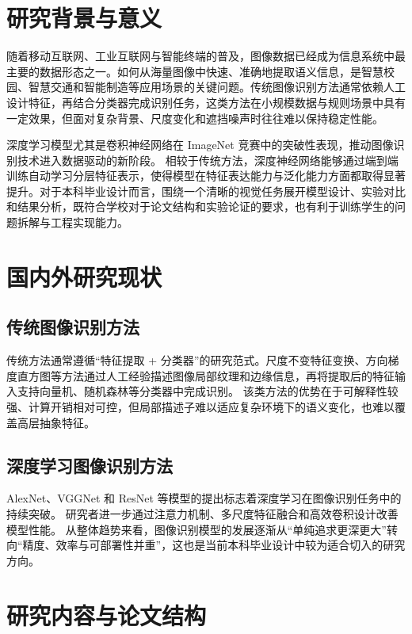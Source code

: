 \section{研究背景与意义}

随着移动互联网、工业互联网与智能终端的普及，图像数据已经成为信息系统中最主要的数据形态之一。如何从海量图像中快速、准确地提取语义信息，是智慧校园、智慧交通和智能制造等应用场景的关键问题。传统图像识别方法通常依赖人工设计特征，再结合分类器完成识别任务，这类方法在小规模数据与规则场景中具有一定效果，但面对复杂背景、尺度变化和遮挡噪声时往往难以保持稳定性能。

深度学习模型尤其是卷积神经网络在 ImageNet 竞赛中的突破性表现，推动图像识别技术进入数据驱动的新阶段。\supercite{krizhevsky2012imagenet,he2016deep} 相较于传统方法，深度神经网络能够通过端到端训练自动学习分层特征表示，使得模型在特征表达能力与泛化能力方面都取得显著提升。对于本科毕业设计而言，围绕一个清晰的视觉任务展开模型设计、实验对比和结果分析，既符合学校对于论文结构和实验论证的要求，也有利于训练学生的问题拆解与工程实现能力。

\section{国内外研究现状}

\subsection{传统图像识别方法}

传统方法通常遵循“特征提取 + 分类器”的研究范式。尺度不变特征变换、方向梯度直方图等方法通过人工经验描述图像局部纹理和边缘信息，再将提取后的特征输入支持向量机、随机森林等分类器中完成识别。\supercite{lowe2004sift,dalal2005hog} 该类方法的优势在于可解释性较强、计算开销相对可控，但局部描述子难以适应复杂环境下的语义变化，也难以覆盖高层抽象特征。

\subsection{深度学习图像识别方法}

AlexNet、VGGNet 和 ResNet 等模型的提出标志着深度学习在图像识别任务中的持续突破。\supercite{krizhevsky2012imagenet,simonyan2015vgg,he2016deep} 研究者进一步通过注意力机制、多尺度特征融合和高效卷积设计改善模型性能。\supercite{hu2018senet,tan2019efficientnet} 从整体趋势来看，图像识别模型的发展逐渐从“单纯追求更深更大”转向“精度、效率与可部署性并重”，这也是当前本科毕业设计中较为适合切入的研究方向。

\section{研究内容与论文结构}

